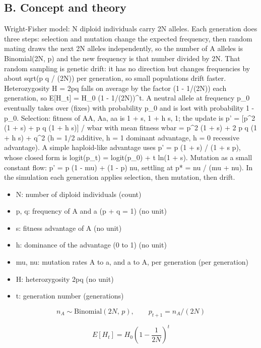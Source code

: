 \documentclass[11pt,a4paper]{article}
\begin{document}
\subsection*{B. Concept and theory}
Wright-Fisher model: N diploid individuals carry 2N alleles. Each generation does three steps: selection and mutation change the expected frequency, then random mating draws the next 2N alleles independently, so the number of A alleles is Binomial(2N, p) and the new frequency is that number divided by 2N. That random sampling is genetic drift: it has no direction but changes frequencies by about sqrt(p q / (2N)) per generation, so small populations drift faster. Heterozygosity H = 2pq falls on average by the factor (1 - 1/(2N)) each generation, so E[H\_t] = H\_0 (1 - 1/(2N))\textasciicircum{}t. A neutral allele at frequency p\_0 eventually takes over (fixes) with probability p\_0 and is lost with probability 1 - p\_0. Selection: fitness of AA, Aa, aa is 1 + s, 1 + h s, 1; the update is p' = [p\textasciicircum{}2 (1 + s) + p q (1 + h s)] / wbar with mean fitness wbar = p\textasciicircum{}2 (1 + s) + 2 p q (1 + h s) + q\textasciicircum{}2 (h = 1/2 additive, h = 1 dominant advantage, h = 0 recessive advantage). A simple haploid-like advantage uses p' = p (1 + s) / (1 + s p), whose closed form is logit(p\_t) = logit(p\_0) + t ln(1 + s). Mutation as a small constant flow: p' = p (1 - mu) + (1 - p) nu, settling at p* = nu / (mu + nu). In the simulation each generation applies selection, then mutation, then drift.

\begin{itemize}[nosep]
\item N: number of diploid individuals (count)
\item p, q: frequency of A and a (p + q = 1) (no unit)
\item s: fitness advantage of A (no unit)
\item h: dominance of the advantage (0 to 1) (no unit)
\item mu, nu: mutation rates A to a, and a to A, per generation (per generation)
\item H: heterozygosity 2pq (no unit)
\item t: generation number (generations)
\end{itemize}

\begin{equation*}
n_A\sim\mathrm{Binomial}(2N,\,p),\qquad p_{t+1}=n_A/(2N)
\end{equation*}

\begin{equation*}
E[H_t]=H_0\left(1-\frac{1}{2N}\right)^{t}
\end{equation*}
\end{document}

